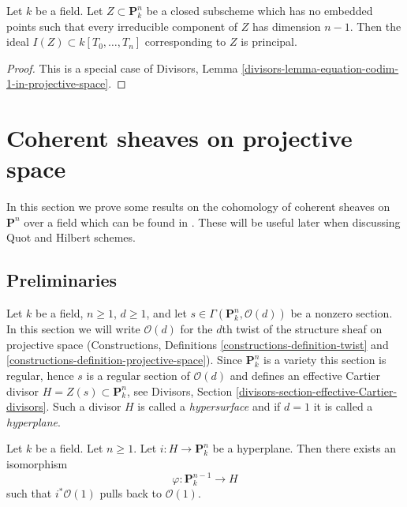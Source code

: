 \begin{lemma}
\label{lemma-equation-codim-1-in-projective-space}
Let $k$ be a field. Let $Z \subset \mathbf{P}^n_k$ be a closed subscheme
which has no embedded points such that every irreducible component
of $Z$ has dimension $n - 1$. Then the ideal $I(Z) \subset k[T_0, \ldots, T_n]$
corresponding to $Z$ is principal.
\end{lemma}

\begin{proof}
This is a special case of
Divisors, Lemma \ref{divisors-lemma-equation-codim-1-in-projective-space}.
\end{proof}




\section{Coherent sheaves on projective space}
\label{section-coherent-Pn}

\noindent
In this section we prove some results on the cohomology of coherent
sheaves on $\mathbf{P}^n$ over a field which can be found in
\cite{Mum}. These will be useful later
when discussing Quot and Hilbert schemes.

\subsection{Preliminaries}
\label{subsection-preliminaries}

\noindent
Let $k$ be a field, $n \geq 1$, $d \geq 1$, and let
$s \in \Gamma(\mathbf{P}_k^n, \mathcal{O}(d))$
be a nonzero section. In this section we will write $\mathcal{O}(d)$
for the $d$th twist of the structure sheaf on projective space
(Constructions, Definitions \ref{constructions-definition-twist} and
\ref{constructions-definition-projective-space}).
Since $\mathbf{P}^n_k$ is a variety this section is regular, hence
$s$ is a regular section of $\mathcal{O}(d)$ and defines an effective
Cartier divisor $H = Z(s) \subset \mathbf{P}^n_k$, see
Divisors, Section \ref{divisors-section-effective-Cartier-divisors}.
Such a divisor $H$ is called a {\it hypersurface} and if $d = 1$
it is called a {\it hyperplane}.

\begin{lemma}
\label{lemma-hyperplane}
Let $k$ be a field. Let $n \geq 1$.
Let $i : H \to \mathbf{P}^n_k$ be a hyperplane.
Then there exists an isomorphism
$$
\varphi : \mathbf{P}^{n - 1}_k \longrightarrow H
$$
such that $i^*\mathcal{O}(1)$ pulls back to $\mathcal{O}(1)$.
\end{lemma}

